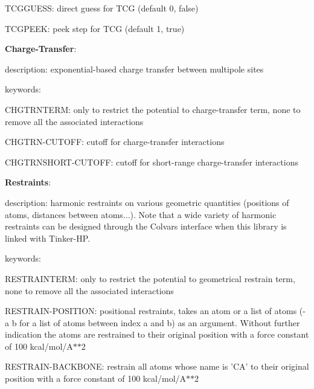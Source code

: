 \begin{DoxyItemize}
\begin{DoxyItemize}
\begin{DoxyItemize}
\item T\-C\-G\-G\-U\-E\-S\-S\-: direct guess for T\-C\-G (default 0, false)
\item T\-C\-G\-P\-E\-E\-K\-: peek step for T\-C\-G (default 1, true)
\end{DoxyItemize}
\end{DoxyItemize}
\item {\bfseries Charge-\/\-Transfer}\-:
\begin{DoxyItemize}
\item description\-: exponential-\/based charge transfer between multipole sites
\item keywords\-:
\begin{DoxyItemize}
\item C\-H\-G\-T\-R\-N\-T\-E\-R\-M\-: only to restrict the potential to charge-\/transfer term, none to remove all the associated interactions
\item C\-H\-G\-T\-R\-N-\/\-C\-U\-T\-O\-F\-F\-: cutoff for charge-\/transfer interactions
\item C\-H\-G\-T\-R\-N\-S\-H\-O\-R\-T-\/\-C\-U\-T\-O\-F\-F\-: cutoff for short-\/range charge-\/transfer interactions
\end{DoxyItemize}
\end{DoxyItemize}
\item {\bfseries Restraints}\-:
\begin{DoxyItemize}
\item description\-: harmonic restraints on various geometric quantities (positions of atoms, distances between atoms...). Note that a wide variety of harmonic restraints can be designed through the Colvars interface when this library is linked with Tinker-\/\-H\-P.
\item keywords\-:
\begin{DoxyItemize}
\item R\-E\-S\-T\-R\-A\-I\-N\-T\-E\-R\-M\-: only to restrict the potential to geometrical restrain term, none to remove all the associated interactions
\item R\-E\-S\-T\-R\-A\-I\-N-\/\-P\-O\-S\-I\-T\-I\-O\-N\-: positional restraints, takes an atom or a list of atoms (-\/a b for a list of atoms between index a and b) as an argument. Without further indication the atoms are restrained to their original position with a force constant of 100 kcal/mol/\-A$\ast$$\ast$2
\item R\-E\-S\-T\-R\-A\-I\-N-\/\-B\-A\-C\-K\-B\-O\-N\-E\-: restrain all atoms whose name is 'C\-A' to their original position with a force constant of 100 kcal/mol/\-A$\ast$$\ast$2

\end{DoxyItemize}
\end{DoxyItemize}
\end{DoxyItemize}
